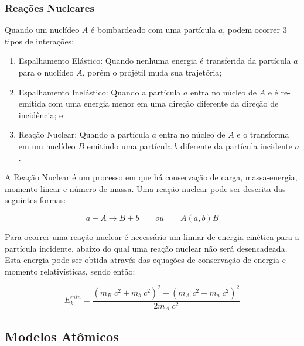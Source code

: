 \documentclass[11pt,a4paper]{article}
\begin{document}
            \subsubsection{Reações Nucleares}
                
                Quando um nuclídeo $A$ é bombardeado com uma partícula $a$, podem ocorrer 3 tipos de interações:

                \begin{enumerate}
                    \item Espalhamento Elástico: Quando nenhuma energia é transferida da partícula $a$ para o nuclídeo $A$, porém o projétil muda sua trajetória;
                    \item Espalhamento Inelástico: Quando a partícula $a$ entra no núcleo de $A$ e é re-emitida com uma energia menor em uma direção diferente da direção de incidência; e   
                    \item Reação Nuclear: Quando a partícula $a$ entra no núcleo de $A$ e o transforma em um nuclídeo $B$ emitindo uma partícula $b$ diferente da partícula incidente $a$. 
                \end{enumerate}

                A Reação Nuclear é um  processo em que há conservação de carga, massa-energia, momento linear e número de massa. Uma reação nuclear pode ser descrita das seguintes formas:
                    
                    \begin{equation}
                        a + A \rightarrow B + b \qquad ou \qquad A(a, b)B
                    \end{equation}
                
                Para ocorrer uma reação nuclear é necessário um limiar de energia cinética para a partícula incidente, abaixo do qual uma reação nuclear não será desencadeada. Esta energia pode ser obtida através das equações de conservação de energia e momento relativísticas, sendo então:

                    \begin{equation}
                        E_k^{min} = \frac{\left(m_B \; c^2 + m_b \; c^2\right)^2 - \left(m_A \; c^2 + m_a \; c^2\right)^2}{2m_A \; c^2}
                    \end{equation}

        \subsection{Modelos Atômicos}
\end{document}
